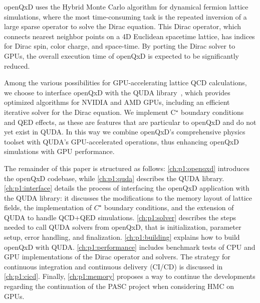 openQxD uses the Hybrid Monte Carlo algorithm for dynamical fermion lattice simulations, where the most time-consuming task is the repeated inversion of a large sparse operator to solve the Dirac equation. This Dirac operator, which connects nearest neighbor points on a 4D Euclidean spacetime lattice, has indices for Dirac spin, color charge, and space-time. By porting the Dirac solver to GPUs, the overall execution time of openQxD is expected to be significantly reduced.

Among the various possibilities for GPU-accelerating lattice QCD calculations, we choose to interface openQxD with the QUDA library~\cite{QUDApaper}, which provides optimized algorithms for NVIDIA and AMD GPUs, including an efficient iterative solver for the Dirac equation. 
We implement C$^\star$ boundary conditions and QED effects, as these are features that are particular to openQxD and do not yet exist in QUDA. In this way we combine openQxD's comprehensive physics toolset with QUDA's GPU-accelerated operations, thus enhancing openQxD simulations with GPU performance.

The remainder of this paper is structured as follows: \cref{ch:p1:openqxd} introduces the openQxD codebase, while \cref{ch:p1:quda} describes the QUDA library. \cref{ch:p1:interface} details the process of interfacing the openQxD application with the QUDA library: it discusses the modifications to the memory layout of lattice fields, the implementation of $C^\star$ boundary conditions, and the extension of QUDA to handle QCD+QED simulations. \cref{ch:p1:solver} describes the steps needed to call QUDA solvers from openQxD, that is initialization, parameter setup, error handling, and finalization. \cref{ch:p1:building} explains how to build openQxD with QUDA. \cref{ch:p1:performance} includes benchmark tests of CPU and GPU implementations of the Dirac operator and solvers. The strategy for continuous integration and continuous delivery (CI/CD) is discussed in \cref{ch:p1:cicd}. Finally, \cref{ch:p1:memory} proposes a way to continue the developments regarding the continuation of the PASC project when considering HMC on GPUs.
